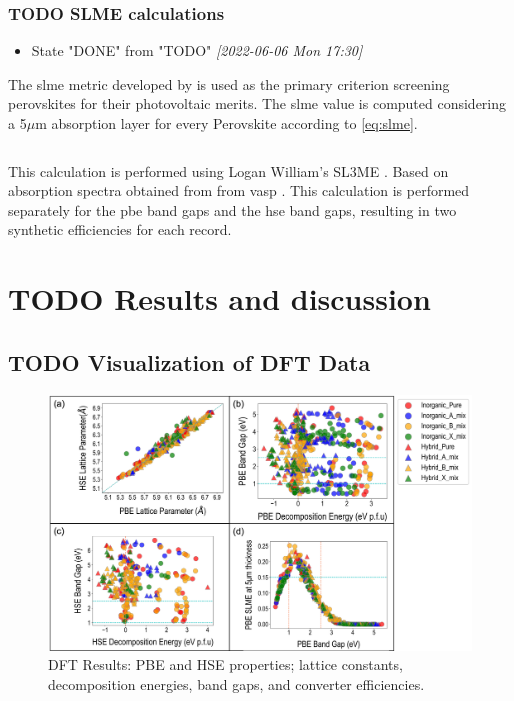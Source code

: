 \documentclass[twoside, twocolumn, 9pt, draft]{article}
\begin{document}
\subsubsection*{{\bfseries\sffamily TODO} SLME calculations}
\label{sec:orga002246}
\begin{itemize}
\item State "DONE"       from "TODO"       \textit{[2022-06-06 Mon 17:30]}
\end{itemize}
The \gls{slme} metric developed by
\citet{yu-2012-ident-poten} is used as the primary criterion
screening perovskites for their photovoltaic merits. The
\gls{slme} value is computed considering a 5\(\mu\)m absorption
layer for every Perovskite according to \eqref{eq:slme}.

\begin{equation}\label{eq:slme}

\end{equation}

This calculation is performed using Logan William's SL3ME
\cite{williams-2022-sl3me}. Based on absorption spectra obtained
from from \gls{vasp} . This calculation is performed
separately for the \acrshort{pbe} band gaps and the
\acrshort{hse} band gaps, resulting in two synthetic
efficiencies for each record.

\section*{{\bfseries\sffamily TODO} Results and discussion}
\label{sec:orgabf5dc1}
\subsection*{{\bfseries\sffamily TODO} Visualization of DFT Data}
\label{sec:org22cf4af}
\begin{figure}
\centering
\includegraphics[width=.9\linewidth]{Figure2.png}
\caption{\label{fig:pairplots} DFT Results: PBE and HSE properties; lattice constants, decomposition energies, band gaps, and converter efficiencies.}
\end{figure}
\end{document}
